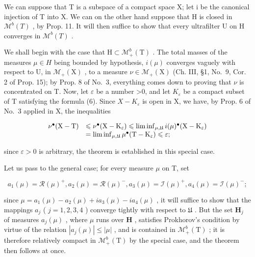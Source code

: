 We can suppose that T is a subspace of a compact space X; let i be the canonical injection of T into X. We can on the other hand suppose that H is closed in \(\mathcal{M}^{b}(T)\) , by Prop. 11. It will then suffice to show that every ultrafilter U on H converges in \(\mathcal{M}^{b}(T)\) .

We shall begin with the case that \(\mathrm{H}\subset\mathcal{M}_{+}^{b}(\mathrm{T})\) . The total masses of the measures \(\mu\in H\) being bounded by hypothesis, \(i(\mu)\) converges vaguely with respect to U, in \(\mathcal{M}_{+}(\mathrm{X})\) , to a measure \(\nu\in\mathcal{M}_{+}(\mathrm{X})\) (Ch. III, §1, No.~9, Cor. 2 of Prop. 15); by Prop. 8 of No.~3, everything comes down to proving that \(\nu\) is concentrated on T. Now, let \(\varepsilon\) be a number \textgreater0, and let \(K_{\varepsilon}\) be a compact subset of T satisfying the formula (6). Since \(X-K_{\varepsilon}\) is open in X, we have, by Prop. 6 of No.~3 applied in X, the inequalities

\[
\begin{array}{r l} \nu^ {\bullet} (\mathrm{X} - \mathrm{T}) & \leqslant \nu^ {\bullet} (\mathrm{X} - \mathrm{K} _ {\varepsilon}) \leqslant \liminf _ {\mu , \mathfrak {U}} i (\mu) ^ {\bullet} (\mathrm{X} - \mathrm{K} _ {\varepsilon}) \\ & = \liminf _ {\mu , \mathfrak {U}} \mu^ {\bullet} (\mathrm{T} - \mathrm{K} _ {\varepsilon}) \leqslant \varepsilon ; \end{array}
\]

since \(\varepsilon > 0\) is arbitrary, the theorem is established in this special case.

Let us pass to the general case; for every measure \(\mu\) on T, set

\[
a _ {1} (\mu) = \mathcal {R} (\mu) ^ {+}, a _ {2} (\mu) = \mathcal {R} (\mu) ^ {-}, a _ {3} (\mu) = \mathcal {I} (\mu) ^ {+}, a _ {4} (\mu) = \mathcal {I} (\mu) ^ {-};
\]

since \(\mu = a_{1}(\mu) - a_{2}(\mu) + ia_{3}(\mu) - ia_{4}(\mu)\) , it will suffice to show that the mappings \(a_{j}\) ( \(j = 1,2,3,4\) ) converge tightly with respect to \(\mathfrak{U}\) . But the set \(\mathbf{H}_j\) of measures \(a_{j}(\mu)\) , where \(\mu\) runs over \(\mathbf{H}\) , satisfies Prokhorov's condition by virtue of the relation \(|a_j(\mu)| \leqslant |\mu|\) , and is contained in \(\mathcal{M}_+^b(\mathrm{T})\) ; it is therefore relatively compact in \(\mathcal{M}_+^b(\mathrm{T})\) by the special case, and the theorem then follows at once.

